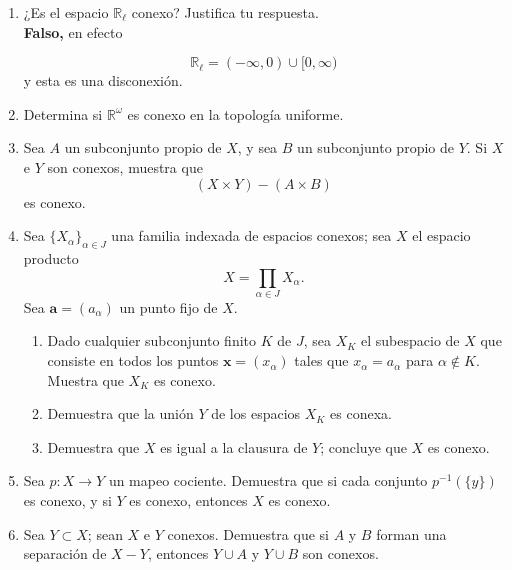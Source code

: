 \documentclass[11pt]{article}
\begin{document}
\begin{enumerate}
\begin{proof}
        $$C=(C\cap A) \cup (C\cap (X-A))\subset \mathring{(X-A)}\cup \mathring{A},$$

        como $C$ es conexo, entonces $C$ cae enteramente en $\mathring{(X-A)}$ o en $\mathring{A}$, esto contradice que $C\cap (X-A)$ y $C\cap A$.
    \end{proof}
    
    \item ¿Es el espacio $\mathbb{R}_\ell$ conexo? Justifica tu respuesta.\\
    
    \textbf{Falso,} en efecto 

    $$\mathbb{R}_{\ell}=(-\infty,0)\cup [0,\infty)$$
     y esta es una disconexión.
    \item Determina si $\mathbb{R}^\omega$ es conexo en la topología uniforme.
    
    \item Sea $A$ un subconjunto propio de $X$, y sea $B$ un subconjunto propio de $Y$. Si $X$ e $Y$ son conexos, muestra que
    \[
    (X \times Y) - (A \times B)
    \]
    es conexo.

    \item Sea $\{X_\alpha\}_{\alpha \in J}$ una familia indexada de espacios conexos; sea $X$ el espacio producto
    \[
    X = \prod_{\alpha \in J} X_\alpha.
    \]
    Sea $\mathbf{a} = (a_\alpha)$ un punto fijo de $X$.
    \begin{enumerate}
        \item Dado cualquier subconjunto finito $K$ de $J$, sea $X_K$ el subespacio de $X$ que consiste en todos los puntos $\mathbf{x} = (x_\alpha)$ tales que $x_\alpha = a_\alpha$ para $\alpha \notin K$. Muestra que $X_K$ es conexo.
        
        \item Demuestra que la unión $Y$ de los espacios $X_K$ es conexa.
        
        \item Demuestra que $X$ es igual a la clausura de $Y$; concluye que $X$ es conexo.
    \end{enumerate}
    
    \item Sea $p : X \to Y$ un mapeo cociente. Demuestra que si cada conjunto $p^{-1}(\{y\})$ es conexo, y si $Y$ es conexo, entonces $X$ es conexo.
    
    \item Sea $Y \subset X$; sean $X$ e $Y$ conexos. Demuestra que si $A$ y $B$ forman una separación de $X - Y$, entonces $Y \cup A$ y $Y \cup B$ son conexos.

\end{enumerate}
   
\end{document}
